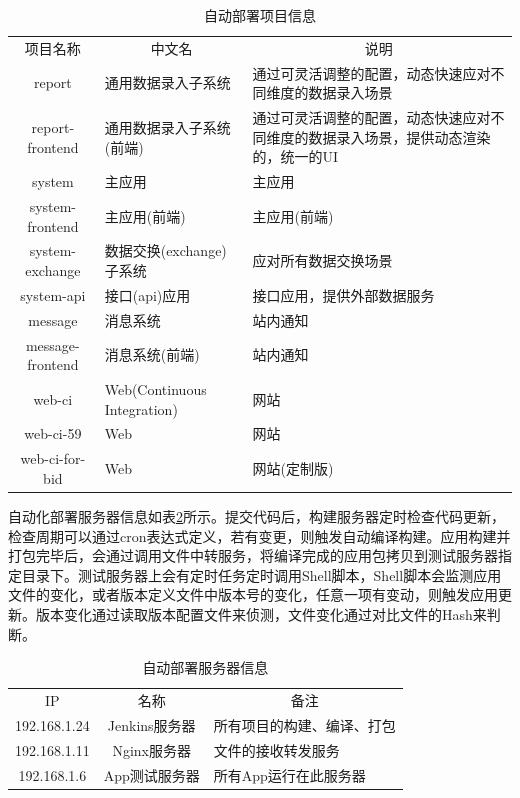 \documentclass[8pt]{book}
\numberwithin{dummy}{section}
\theoremstyle{ocrenumbox}
\theoremstyle{blacknumex}
\theoremstyle{blacknumbox}
\theoremstyle{ocrenum}
\begin{document}
\begin{table}[htbp]
	\caption{自动部署项目信息}
	\label{table:databaseconnectionpool}
	\begin{center}
		\begin{tabular}{|c|p{4.5cm}|p{4cm}|}
			\hline
			\multirow{1}{*}{项目名称}
			& \multicolumn{1}{c|}{中文名} 
			& \multicolumn{1}{c|}{说明}\\			
			\cline{1-3}
			report &  通用数据录入子系统  & 通过可灵活调整的配置，动态快速应对不同维度的数据录入场景 \\
			\hline
			report-frontend & 通用数据录入子系统(前端) & 通过可灵活调整的配置，动态快速应对不同维度的数据录入场景，提供动态渲染的，统一的UI \\
			\hline
			system & 主应用 & 主应用 \\
			\hline
			system-frontend & 主应用(前端) & 主应用(前端) \\
			\hline
			system-exchange & 数据交换(exchange)子系统 & 应对所有数据交换场景 \\
			\hline
			system-api & 接口(api)应用 & 接口应用，提供外部数据服务 \\
			\hline
			message & 消息系统 & 站内通知 \\
			\hline
			message-frontend & 消息系统(前端) & 站内通知 \\
			\hline
			web-ci & Web(Continuous Integration) & 网站 \\
			\hline
			web-ci-59 & Web & 网站 \\
			\hline
			web-ci-for-bid & Web & 网站(定制版) \\
			\hline				
		\end{tabular}	
	\end{center}
\end{table}

自动化部署服务器信息如表\ref{table:databaseconnectionpool}所示。提交代码后，构建服务器定时检查代码更新，检查周期可以通过cron表达式定义，若有变更，则触发自动编译构建。应用构建并打包完毕后，会通过调用文件中转服务，将编译完成的应用包拷贝到测试服务器指定目录下。测试服务器上会有定时任务定时调用Shell脚本，Shell脚本会监测应用文件的变化，或者版本定义文件中版本号的变化，任意一项有变动，则触发应用更新。版本变化通过读取版本配置文件来侦测，文件变化通过对比文件的Hash来判断。

\begin{table}[htbp]
	\caption{自动部署服务器信息}
	\label{table:databaseconnectionpool}
	\begin{center}
		\begin{tabular}{|c|c|p{5cm}|}
			\hline
			\multirow{1}{*}{IP}
			& \multicolumn{1}{c|}{名称} 
			& \multicolumn{1}{c|}{备注}\\			
			\cline{1-3}
			192.168.1.24 &  Jenkins服务器  & 所有项目的构建、编译、打包 \\
			\hline
			192.168.1.11 & Nginx服务器 & 文件的接收转发服务 \\
			\hline
			192.168.1.6 & App测试服务器 & 所有App运行在此服务器 \\
			\hline				
		\end{tabular}	
	\end{center}
\end{table}
\end{document}
